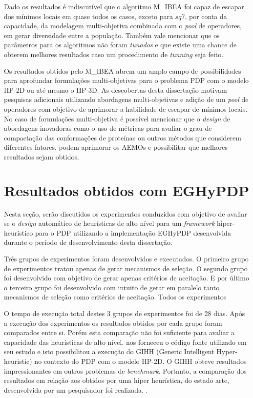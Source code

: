 Dado os resultados é indiscutível que o algoritmo M\_IBEA foi capaz de escapar dos mínimos locais em quase todos os casos, exceto para $sq7$, por conta da capacidade, da modelagem multi-objetiva combinada com o \textit{pool} de operadores, em gerar diversidade entre a população. Também vale mencionar que os parâmetros para os algoritmos não foram \textit{tunados} e que existe uma chance de obterem melhores resultados caso um procedimento de \textit{tunning} seja feito.

Os resultados obtidos pelo M\_IBEA abrem um amplo campo de possibilidades para aprofundar formulações multi-objetivas para o problema PDP com o modelo HP-2D ou até mesmo o HP-3D. As descobertas desta dissertação motivam pesquisas adicionais utilizando abordagens multi-objetivas e adição de um \textit{pool} de operadores com objetivo de aprimorar a habilidade de escapar de mínimos locais. No caso de formulações multi-objetiva é possível mencionar que o \textit{design} de abordagens inovadoras como o uso de métricas para avaliar o grau de compactação das conformações de proteínas ou outros métodos que considerem diferentes fatores, podem aprimorar os AEMOs e possibilitar que melhores resultados sejam obtidos.



\section{Resultados obtidos com EGHyPDP}

Nesta seção, serão discutidos  os experimentos conduzidos com objetivo de avaliar se o \textit{design} automático de heurísticas de alto nível para um \textit{framework} hiper-heurístico para o PDP utilizando a implementação EGHyPDP desenvolvida durante o período de desenvolvimento desta dissertação.

Três grupos de experimentos foram desenvolvidos e executados. O primeiro grupo de experimentos tratou apenas de gerar mecanismos de seleção. O segundo grupo foi desenvolvido com objetivo de gerar apenas critérios de aceitação. E por último o terceiro grupo foi desenvolvido com intuito de gerar em paralelo tanto mecanismos de seleção como critérios de aceitação. Todos os experimentos

O tempo de execução total destes 3 grupos de experimentos foi de 28 dias. Após a execução dos experimentos os resultados obtidos por cada grupo foram comparados entre si. Porém esta comparação não foi suficiente para avaliar a capacidade das heurísticas de alto nível. \cite{misir2012intelligent} nos forneceu o código fonte utilizado em seu estudo e isto possibilitou a execução do GIHH (Generic Intelligent Hyper-heuristic) no contexto do PDP com o modelo HP-2D. O GIHH obteve resultados impressionantes em outros problemas de \textit{benchmark}. Portanto, a comparação dos resultados em relação aos obtidos por uma hiper heurística, do estado arte, desenvolvida por um pesquisador foi realizada.   	. 


